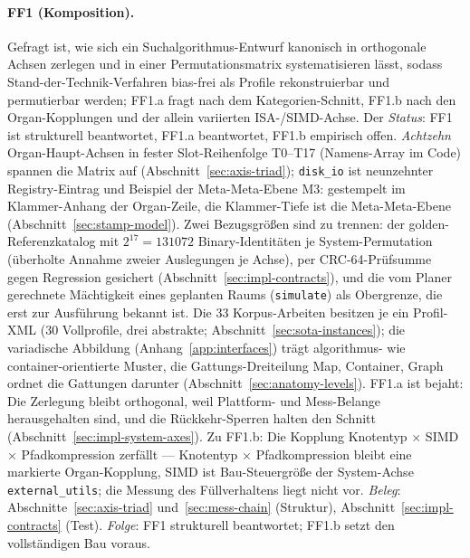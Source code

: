 \begin{nurkurz}
\paragraph{FF1 (Komposition).} Gefragt ist, wie sich ein Suchalgorithmus-Entwurf kanonisch in orthogonale
Achsen zerlegen und in einer Permutationsmatrix systematisieren lässt, sodass Stand-der-Technik-Verfahren
bias-frei als Profile rekonstruierbar und permutierbar werden; FF1.a fragt nach dem Kategorien-Schnitt,
FF1.b
nach den Organ-Kopplungen und der allein variierten ISA-/SIMD-Achse. Der \emph{Status}: FF1 ist strukturell
beantwortet, FF1.a beantwortet, FF1.b empirisch offen.
\emph{Achtzehn} Organ-Haupt-Achsen in fester Slot-Reihenfolge T0--T17 (Namens-Array im Code) spannen die
Matrix auf (Abschnitt~\ref{sec:axis-triad}); \texttt{disk\_io} ist neunzehnter Registry-Eintrag und Beispiel
der Meta-Meta-Ebene M3: gestempelt im Klammer-Anhang der Organ-Zeile, die Klammer-Tiefe ist die
Meta-Meta-Ebene (Abschnitt~\ref{sec:stamp-model}). Zwei Bezugsgrößen sind zu trennen: der
golden-Referenzkatalog mit $2^{17} = 131072$ Binary-Identitäten je System-Permutation (überholte Annahme zweier
Auslegungen je Achse), per CRC-64-Prüfsumme gegen Regression gesichert (Abschnitt~\ref{sec:impl-contracts}),
und die vom Planer gerechnete Mächtigkeit eines geplanten Raums (\texttt{simulate}) als Obergrenze, die erst
zur Ausführung bekannt ist. Die 33 Korpus-Arbeiten besitzen je ein Profil-XML (30
Vollprofile,
drei abstrakte; Abschnitt~\ref{sec:sota-instances}); die variadische Abbildung (Anhang~\ref{app:interfaces})
trägt algorithmus- wie container-orientierte Muster, die Gattungs-Dreiteilung Map, Container, Graph ordnet
die Gattungen darunter (Abschnitt~\ref{sec:anatomy-levels}).
FF1.a ist bejaht: Die Zerlegung bleibt orthogonal, weil Plattform- und Mess-Belange herausgehalten sind, und
die Rückkehr-Sperren halten den Schnitt (Abschnitt~\ref{sec:impl-system-axes}). Zu FF1.b: Die Kopplung
Knotentyp $\times$ SIMD $\times$ Pfadkompression zerfällt --- Knotentyp $\times$ Pfadkompression bleibt eine
markierte Organ-Kopplung, SIMD ist Bau-Steuergröße der System-Achse \texttt{external\_utils}; die Messung
des
Füllverhaltens liegt nicht vor.
\emph{Beleg}: Abschnitte~\ref{sec:axis-triad} und~\ref{sec:mess-chain} (Struktur),
Abschnitt~\ref{sec:impl-contracts} (Test).
\emph{Folge}: FF1 strukturell beantwortet; FF1.b setzt den vollständigen Bau voraus.
\end{nurkurz}

